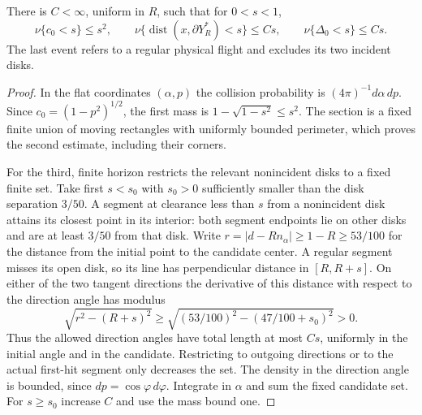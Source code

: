 \begin{lemma}
\label{lem:v46-margin-neighborhoods}
There is $C<\infty$, uniform in $R$, such that for $0<s<1$,
\begin{equation}\label{eq:v46-one-step-boundary}
 \nu\{c_0<s\}\le s^2,\qquad
 \nu\{\operatorname{dist}(x,\partial Y_R^*)<s\}\le Cs,
 \qquad \nu\{\Delta_0<s\}\le Cs.
\end{equation}
The last event refers to a regular physical flight and excludes its
two incident disks.
\end{lemma}
\begin{proof}
In the flat coordinates $(\alpha,p)$ the collision probability is
$(4\pi)^{-1}d\alpha\,dp$. Since $c_0=(1-p^2)^{1/2}$, the first mass
is $1-\sqrt{1-s^2}\le s^2$. The section is a fixed finite union of
moving rectangles with uniformly bounded perimeter, which proves the
second estimate, including their corners.

For the third, finite horizon restricts the relevant nonincident disks
to a fixed finite set. Take first $s<s_0$ with $s_0>0$ sufficiently
smaller than the disk separation $3/50$. A segment at clearance less
than $s$ from a nonincident disk attains its closest point in its
interior: both segment endpoints lie on other disks and are at least
$3/50$ from that disk. Write $r=|d-Rn_\alpha|\ge1-R\ge53/100$ for
the distance from the initial point to the candidate center. A regular
segment misses its open disk, so its line has perpendicular distance
in $[R,R+s]$. On either of the two tangent directions the derivative
of this distance with respect to the direction angle has modulus
\[
 \sqrt{r^2-(R+s)^2}\ge
     \sqrt{(53/100)^2-(47/100+s_0)^2}>0.
\]
Thus the allowed direction angles have total length at most $Cs$,
uniformly in the initial angle and in the candidate. Restricting to
outgoing directions or to the actual first-hit segment only decreases
the set. The density in the direction angle is bounded, since
$dp=\cos\varphi\,d\varphi$. Integrate in $\alpha$ and sum the fixed
candidate set. For $s\ge s_0$ increase $C$ and use the mass bound one.
\end{proof}

